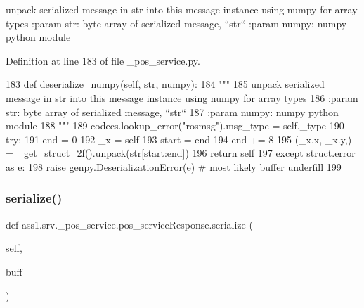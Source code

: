 \begin{DoxyVerb}unpack serialized message in str into this message instance using numpy for array types
:param str: byte array of serialized message, ``str``
:param numpy: numpy python module
\end{DoxyVerb}
 

Definition at line 183 of file \+\_\+pos\+\_\+service.\+py.


\begin{DoxyCode}
183   \textcolor{keyword}{def }deserialize\_numpy(self, str, numpy):
184     \textcolor{stringliteral}{"""}
185 \textcolor{stringliteral}{    unpack serialized message in str into this message instance using numpy for array types}
186 \textcolor{stringliteral}{    :param str: byte array of serialized message, ``str``}
187 \textcolor{stringliteral}{    :param numpy: numpy python module}
188 \textcolor{stringliteral}{    """}
189     codecs.lookup\_error(\textcolor{stringliteral}{"rosmsg"}).msg\_type = self.\_type
190     \textcolor{keywordflow}{try}:
191       end = 0
192       \_x = self
193       start = end
194       end += 8
195       (\_x.x, \_x.y,) = \_get\_struct\_2f().unpack(str[start:end])
196       \textcolor{keywordflow}{return} self
197     \textcolor{keywordflow}{except} struct.error \textcolor{keyword}{as} e:
198       \textcolor{keywordflow}{raise} genpy.DeserializationError(e)  \textcolor{comment}{# most likely buffer underfill}
199 
\end{DoxyCode}
\mbox{\label{classass1_1_1srv_1_1__pos__service_1_1pos__serviceResponse_ae5a097dc426d7a9b31e126eda37f356d}} 
\subsubsection{\texorpdfstring{serialize()}{serialize()}}
{\footnotesize\ttfamily def ass1.\+srv.\+\_\+pos\+\_\+service.\+pos\+\_\+service\+Response.\+serialize (\begin{DoxyParamCaption}\item[{}]{self,  }\item[{}]{buff }\end{DoxyParamCaption})}


